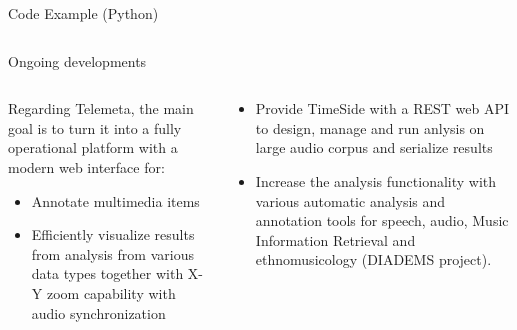 \documentclass[final, hyperref, table]{beamer}
\begin{document}
\begin{frame}[containsverbatim]{}
\begin{columns}[T]
\begin{column}[T]{.49\linewidth}
\begin{block}{Code Example (Python)}
\begin{columns}[T]
  \begin{column}[T]{0.35\linewidth}
  \end{column}
\end{columns}
  \end{block}

  \begin{block}{Ongoing developments}
    \begin{columns}
      \begin{column}{0.47\linewidth}
        Regarding Telemeta, the main goal is to turn it into a fully operational platform with a modern web interface for:
        \begin{itemize}
        \item \alert{Annotate} multimedia items
        \item Efficiently \alert{visualize} results from analysis from various data types together with X-Y zoom capability with audio synchronization
        \end{itemize}
      \end{column}
      \begin{column}{0.47\linewidth}
        \begin{itemize}
        \item Provide TimeSide with a REST web API to design, manage and run
          anlysis on large audio corpus and serialize results
        \item Increase the analysis functionality with various automatic analysis and annotation tools for speech, audio, Music Information Retrieval and ethnomusicology (DIADEMS project).
\end{itemize}
      \end{column}
    \end{columns}
    

\end{block}
\end{column}
\end{columns}
\end{frame}
\end{document}
